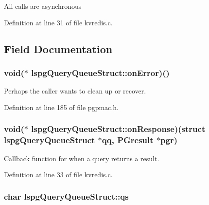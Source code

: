 All calls are asynchronous 

Definition at line 31 of file kvredis.\-c.



\subsection{Field Documentation}
\hypertarget{structlspgQueryQueueStruct_ac7e4b4a8c59d7c814670ed1004154c2c}{
\subsubsection[{on\-Error}]{\setlength{\rightskip}{0pt plus 5cm}void($\ast$ lspg\-Query\-Queue\-Struct\-::on\-Error)()}}\label{structlspgQueryQueueStruct_ac7e4b4a8c59d7c814670ed1004154c2c}


Perhaps the caller wants to clean up or recover. 



Definition at line 185 of file pgpmac.\-h.

\hypertarget{structlspgQueryQueueStruct_a53bac5ae4cab775423940bff5092a831}{
\subsubsection[{on\-Response}]{\setlength{\rightskip}{0pt plus 5cm}void($\ast$ lspg\-Query\-Queue\-Struct\-::on\-Response)(struct {\bf lspg\-Query\-Queue\-Struct} $\ast$qq, P\-Gresult $\ast$pgr)}}\label{structlspgQueryQueueStruct_a53bac5ae4cab775423940bff5092a831}


Callback function for when a query returns a result. 



Definition at line 33 of file kvredis.\-c.

\hypertarget{structlspgQueryQueueStruct_a1389b3ec4ddf9ed5cc0344d229a7ff9e}{
\subsubsection[{qs}]{\setlength{\rightskip}{0pt plus 5cm}char lspg\-Query\-Queue\-Struct\-::qs}}\label{structlspgQueryQueueStruct_a1389b3ec4ddf9ed5cc0344d229a7ff9e}


